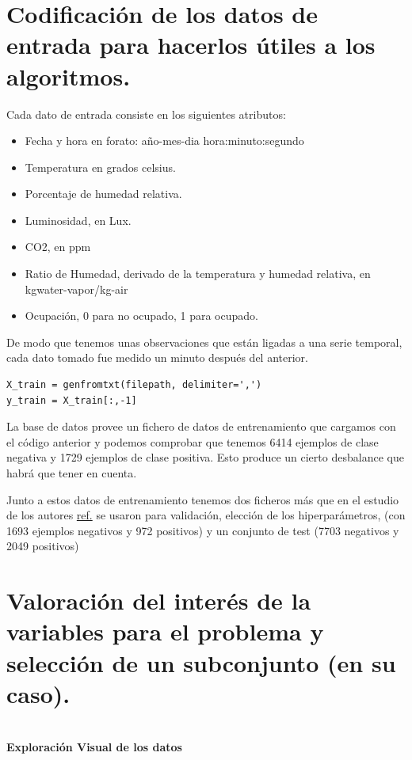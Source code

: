 \documentclass{article}
\begin{document}
\section{Codificación de los datos de entrada para hacerlos útiles a los algoritmos.}

Cada dato de entrada consiste en los siguientes atributos:
\begin{itemize}
    \itemsep0em 
    \item Fecha y hora en forato: año-mes-dia hora:minuto:segundo 
    \item Temperatura en grados celsius.
    \item Porcentaje de humedad relativa.
    \item Luminosidad, en Lux.
    \item CO2, en ppm 
    \item Ratio de Humedad, derivado de la temperatura y humedad relativa, en kgwater-vapor/kg-air 
    \item Ocupación, 0 para no ocupado, 1 para ocupado.
\end{itemize}

De modo que tenemos unas observaciones que están ligadas a una serie temporal, cada dato tomado fue medido un minuto después del anterior.

\begin{verbatim}
X_train = genfromtxt(filepath, delimiter=',')
y_train = X_train[:,-1]
\end{verbatim}

La base de datos provee un fichero de datos de entrenamiento que cargamos con el código anterior y podemos comprobar que tenemos 6414 ejemplos de clase negativa y 1729 ejemplos de clase positiva. Esto produce un cierto desbalance que habrá que tener en cuenta.

Junto a estos datos de entrenamiento tenemos dos ficheros más que en el estudio de los autores \href{https://archive.ics.uci.edu/ml/datasets/Occupancy+Detection+/}{\color{blue}ref.} se usaron para validación, elección de los hiperparámetros, (con 1693 ejemplos negativos y 972 positivos) y un conjunto de test (7703 negativos y 2049 positivos)

\newpage
\section{Valoración del interés de la variables para el problema y selección de un subconjunto (en su caso).}

~\\
{\noindent \bf \large Exploración Visual de los datos}
\end{document}
